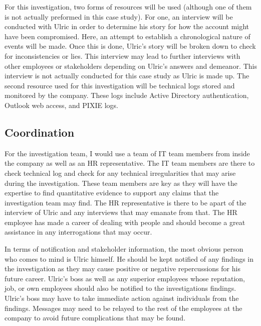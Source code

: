 \documentclass[paper=a4, fontsize=11pt]{scrartcl} %
\numberwithin{equation}{section} %
\numberwithin{figure}{section} %
\numberwithin{table}{section} %
\begin{document}
For this investigation, two forms of resources will be used (although one of them is not
actually preformed in this case study). For one, an interview will be conducted with Ulric in
order to determine his story for how the account might have been compromised. Here, an
attempt to establish a chronological nature of events will be made. Once this is done,
Ulric's story will be broken down to check for inconsistencies or lies. This interview
may lead to further interviews with other employees or stakeholders depending on Ulric's
answers and demeanor. This interview is not actually conducted for this case study as
Ulric is made up. The second resource used for this investigation will be technical logs
stored and monitored by the company. These logs include Active Directory authentication, Outlook
web access, and PIXIE logs. 


\subsection{Coordination}
For the investigation team, I would use a team of IT team members from inside the company as
well as an HR representative. The IT team members are there to check technical log and check
for any technical irregularities that may arise during the investigation. These team members are
key as they will have the expertise to find quantitative evidence to support any claims that
the investigation team may find. The HR representative is there to be apart of the interview of
Ulric and any interviews that may emanate from that. The HR employee has made a career of dealing
with people and should become a great assistance in any interrogations that may occur.

In terms of notification and stakeholder information, the most obvious person who comes to mind
is Ulric himself. He should be kept notified of any findings in the investigation as they may
cause positive or negative repercussions for his future career. Ulric's boss as well as any 
superior employees whose reputation, job, or own employees should also be notified to the
investigations findings. Ulric's boss may have to take immediate action against individuals
from the findings. Messages may need to be relayed to the rest of the employees at the company
to avoid future complications that may be found.

\end{document}
